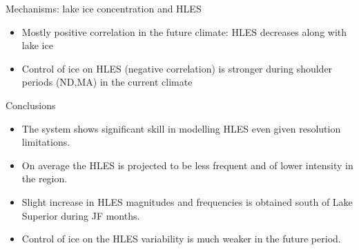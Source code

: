\documentclass{beamer}
\begin{document}
  \begin{frame}{Mechanisms: lake ice concentration and HLES}

    \begin{itemize}
      \item Mostly positive correlation in the future climate: HLES decreases along with lake ice
      \item Control of ice on HLES (negative correlation) is stronger during shoulder periods (ND,MA) in the current climate
    \end{itemize}

  \end{frame}



  \begin{frame}{Conclusions}
    \begin{itemize}
      \item The system shows significant skill in modelling HLES even given resolution limitations.
      \item On average the HLES is projected to be less frequent and of lower intensity in the region.
      \item Slight increase in HLES magnitudes and frequencies is obtained south of Lake Superior during JF months.
      \item Control of ice on the HLES variability is much weaker in the future period.
    \end{itemize}
  \end{frame}
\end{document}
